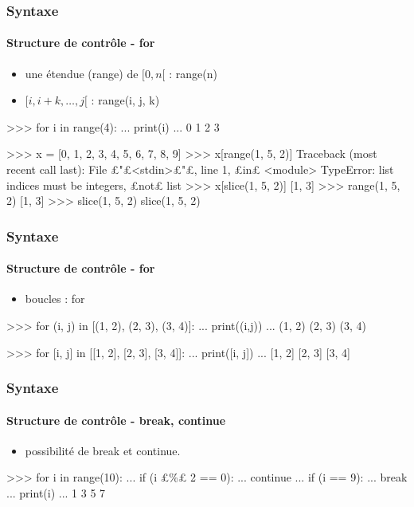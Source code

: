 \begin{frame}[fragile]
\frametitle{Syntaxe}
\framesubtitle{Structure de contrôle - for}
\begin{itemize}
 \item une étendue (range) de ${[0, n[}$ : range(n) 
 \item ${[i, i + k, \dots, j[}$ : range(i, j, k) 
\end{itemize}
\begin{pythonConsole}
>>> for i in range(4): 
...     print(i)
... 
0
1
2
3
\end{pythonConsole}
\begin{pythonConsole}
>>> x = [0, 1, 2, 3, 4, 5, 6, 7, 8, 9]
>>> x[range(1, 5, 2)]
Traceback (most recent call last):
  File £"£<stdin>£"£, line 1, £in£ <module>
TypeError: list indices must be integers, £not£ list
>>> x[slice(1, 5, 2)]
[1, 3]
>>> range(1, 5, 2)
[1, 3]
>>> slice(1, 5, 2)
slice(1, 5, 2)
\end{pythonConsole}
\end{frame}
\begin{frame}[fragile]
\frametitle{Syntaxe}
\framesubtitle{Structure de contrôle - for}
\begin{itemize}
\item boucles : for 
\end{itemize}
\begin{pythonConsole}
>>> for (i, j) in [(1, 2), (2, 3), (3, 4)]: 
...   print((i,j))
... 
(1, 2)
(2, 3)
(3, 4)
\end{pythonConsole}
\begin{pythonConsole}
>>> for [i, j] in [[1, 2], [2, 3], [3, 4]]: 
...   print([i, j])
... 
[1, 2]
[2, 3]
[3, 4]
\end{pythonConsole}
\end{frame}
\begin{frame}[fragile]
\frametitle{Syntaxe}
\framesubtitle{Structure de contrôle - break, continue}
\begin{itemize}
\item possibilité de break et continue. 
\end{itemize}
\begin{pythonConsole}
>>> for i in range(10):
...   if (i £\%£ 2 == 0): 
...     continue
...   if (i == 9): 
...     break
...   print(i)
...
1
3
5
7
\end{pythonConsole}
\end{frame}
